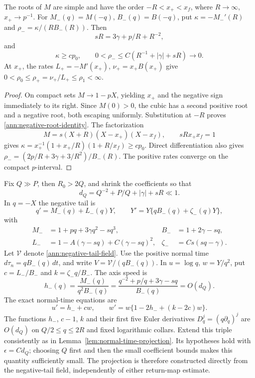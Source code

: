 \begin{lemma}\label{ann:lem-axis-roots}
The roots of \(M\) are simple and have the order
\(-R<x_+<x_f\), where \(R\to\infty\), \(x_+\to p^{-1}\).
For \(M_-(q)=M(-q)\), \(B_-(q)=B(-q)\), put
\(\kappa=-M_-'(R)\) and \(\rho_-=\kappa/(RB_-(R))\).
Then
\begin{equation}\label{ann:negative-root-identity}
 sR=3\gamma+p/R+R^{-2},
\end{equation}
and
\begin{equation}\label{ann:small-negative-index}
 \kappa\ge cp_0,\qquad
 0<\rho_-\le C(R^{-1}+|\gamma|+sR)\longrightarrow0 .
\end{equation}
At \(x_+\), the rates \(L_+=-M'(x_+)\), \(\nu_+=x_+B(x_+)\)
give \(0<\rho_0\le\rho_+=\nu_+/L_+\le\rho_1<\infty\).
\end{lemma}
\begin{proof}
On compact sets \(M\to1-pX\), yielding \(x_+\) and the negative
sign immediately to its right. Since \(M(0)>0\), the cubic has a
second positive root and a negative root, both escaping uniformly.
Substitution at \(-R\) proves \eqref{ann:negative-root-identity}.
The factorization
\[
 M=s(X+R)(X-x_+)(X-x_f),\qquad sRx_+x_f=1
\]
gives
\(\kappa=x_+^{-1}(1+x_+/R)(1+R/x_f)\ge cp_0\).
Direct differentiation also gives
\(\rho_-=(2p/R+3\gamma+3/R^2)/B_-(R)\).
The positive rates converge on the compact \(p\)-interval.
\end{proof}

Fix \(Q\gg P\), then \(R_0>2Q\), and shrink the coefficients so that
\begin{equation}\label{ann:delta-Q}
 d_Q=Q^{-2}+P/Q+|\gamma|+sR\ll1 .
\end{equation}
In \(q=-X\) the negative tail is
\begin{equation}\label{ann:negative-tail-field}
 q'=M_-(q)+L_-(q)Y,\qquad
 Y'=Y\{qB_-(q)+\zeta_-(q)Y\},
\end{equation}
with
\[
 \begin{aligned}
 M_-&=1+pq+3\gamma q^2-sq^3,& B_-&=1+2\gamma-sq,\\
 L_-&=1-A(\gamma-sq)+C(\gamma-sq)^2,&
 \zeta_-&=Cs(sq-\gamma).
 \end{aligned}
\]
Let \(\mathcal V\) denote \eqref{ann:negative-tail-field}.  Use the
positive normal time \(d\tau_n=qB_-(q)\,dt\), and write
\(V=\mathcal V/(qB_-(q))\).  In \(u=\log q\), \(w=Y/q^2\),
put \(c=L_-/B_-\) and \(k=\zeta_-q/B_-\).  The axis speed is
\begin{equation}\label{ann:negative-slow-speed}
 h_-(q)=\frac{M_-(q)}{q^2B_-(q)}
       =\frac{q^{-2}+p/q+3\gamma-sq}{B_-(q)}=O(d_Q).
\end{equation}
The exact normal-time equations are
\[
 u'=h_-+cw,\qquad w'=w\{1-2h_-+(k-2c)w\}.
\]
The functions \(h_-\), \(c-1\), \(k\) and their first five Euler
derivatives \(D_q^j=(q\partial_q)^j\) are \(O(d_Q)\) on
\(Q/2\le q\le2R\) and fixed logarithmic collars.
Extend this triple consistently as in
Lemma~\ref{lem:normal-time-projection}.  Its hypotheses hold with
\(\epsilon=Cd_Q\); choosing \(Q\) first and then the small
coefficient bounds makes this quantity sufficiently small.  The
projection is therefore constructed directly from the negative-tail
field, independently of either return-map estimate.

